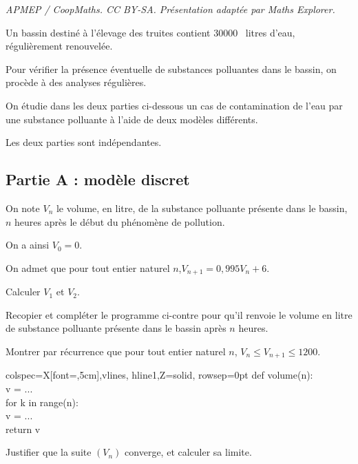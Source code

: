 \documentclass[10pt]{article}
\providecommand{\np}[2][]{{#2~#1}}
\begin{document}
\noindent\textit{APMEP / CoopMaths. CC BY-SA. Présentation adaptée par Maths Explorer.}\par\medskip
Un bassin destiné à l'élevage des truites contient \np{30000} litres d'eau, régulièrement renouvelée.

	Pour vérifier la présence éventuelle de substances polluantes dans le bassin, on procède à des analyses régulières.

	On étudie dans les deux parties ci-dessous un cas de contamination de l'eau par une substance polluante à l'aide de deux modèles différents.

	Les deux parties sont indépendantes.

	\subsection*{\centering Partie A : modèle discret}

		On note $V_{n}$ le volume, en litre, de la substance polluante présente dans le bassin, $n$ heures après le début du phénomène de pollution.

		On a ainsi \quad $V_{0}=0$.

		On admet que pour tout entier naturel $n$,\quad $V_{n+1}=0,995 V_{n}+6$.

		\begin{enumerate}
			\item Calculer $V_{1}$ et $V_{2}$.

			\item \begin{minipage}[t]{0.55\linewidth}
				Recopier et compléter le programme ci-contre pour qu'il renvoie le volume en litre de substance polluante présente dans le bassin après $n$ heures.
				\item Montrer par récurrence que pour tout entier naturel $n$,  $V_{n} \leqslant  V_{n+1} \leqslant  1200$.

			\end{minipage}\hfill
			\begin{tblr}[T]{colspec={X[font=\ttfamily,5cm]},vlines, hline{1,Z}={solid}, rowsep=0pt}
				def volume(n):\\
				\quad v = ...\\
				\quad for k in range(n):\\
				\quad \quad	v = ...\\
				\quad return v\\
			\end{tblr}


			\item Justifier que la suite $(V_{n})$ converge, et calculer sa limite.
		\end{enumerate}
\end{document}
